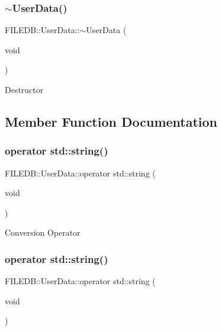 \subsubsection{\texorpdfstring{$\sim$UserData()}{~UserData()}\hspace{0.1cm}{\footnotesize\ttfamily [3/3]}}
{\footnotesize\ttfamily F\+I\+L\+E\+D\+B\+::\+User\+Data\+::$\sim$\+User\+Data (\begin{DoxyParamCaption}\item[{void}]{ }\end{DoxyParamCaption})}

Destructor 

\subsection{Member Function Documentation}
\mbox{\label{classFILEDB_1_1UserData_a5e54144b7f24d68684ddc85e036d0605}} 
\subsubsection{\texorpdfstring{operator std::string()}{operator std::string()}\hspace{0.1cm}{\footnotesize\ttfamily [1/3]}}
{\footnotesize\ttfamily F\+I\+L\+E\+D\+B\+::\+User\+Data\+::operator std\+::string (\begin{DoxyParamCaption}\item[{void}]{ }\end{DoxyParamCaption})}

Conversion Operator \mbox{\label{classFILEDB_1_1UserData_a5e54144b7f24d68684ddc85e036d0605}} 
\subsubsection{\texorpdfstring{operator std::string()}{operator std::string()}\hspace{0.1cm}{\footnotesize\ttfamily [2/3]}}
{\footnotesize\ttfamily F\+I\+L\+E\+D\+B\+::\+User\+Data\+::operator std\+::string (\begin{DoxyParamCaption}\item[{void}]{ }\end{DoxyParamCaption})}

